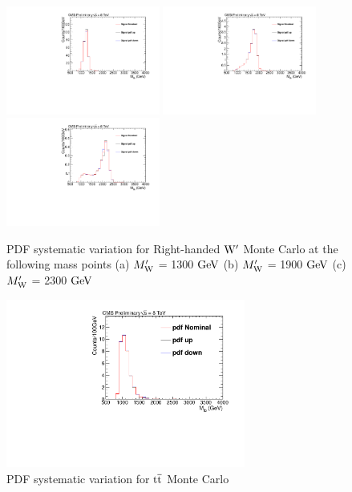 \begin{figure}[htcb]
\begin{center}
\includegraphics[width=0.45\textwidth]{AN-13-004/figs/Signal_M1300_PdfScaleNNPDF23.pdf}
\includegraphics[width=0.45\textwidth]{AN-13-004/figs/Signal_M1900_PdfScaleNNPDF23.pdf}
\includegraphics[width=0.45\textwidth]{AN-13-004/figs/Signal_M2300_PdfScaleNNPDF23.pdf}
\caption{
PDF systematic variation for Right-handed $\mathrm{W}^\prime$ Monte Carlo at the following mass points
(a) $M_\mathrm{W}^\prime$ = 1300$~\mathrm{GeV}$ 
(b) $M_\mathrm{W}^\prime$ = 1900$~\mathrm{GeV}$
(c) $M_\mathrm{W}^\prime$ = 2300$~\mathrm{GeV}$ 
}
\label{figs:signalPDF}
\end{center}
\end{figure}

\begin{figure}[htcb]
\begin{center}
\includegraphics[width=0.7\textwidth]{AN-13-004/figs/TTbar_PdfScaleNNPDF23.pdf}
\caption{PDF systematic variation for $\mathrm{t\overline{t}}$ Monte Carlo}
\label{figs:ttbarPDF}
\end{center}
\end{figure}

